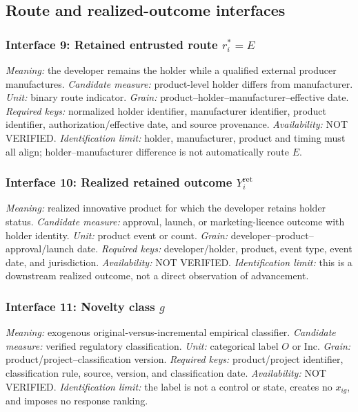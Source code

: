 \subsection{Route and realized-outcome interfaces}
\label{subsec:p10-routes-outcomes}

\subsubsection{Interface 9: Retained entrusted route \texorpdfstring{\(r_i^*=E\)}{retained route E}}
\textit{Meaning:} the developer remains the holder while a qualified external
producer manufactures.
\textit{Candidate measure:} product-level holder differs from manufacturer.
\textit{Unit:} binary route indicator.
\textit{Grain:} product--holder--manufacturer--effective date.
\textit{Required keys:} normalized holder identifier, manufacturer identifier,
product identifier, authorization/effective date, and source provenance.
\textit{Availability:} NOT VERIFIED.
\textit{Identification limit:} holder, manufacturer, product and timing must
all align; holder--manufacturer difference is not automatically route \(E\).

\subsubsection{Interface 10: Realized retained outcome \texorpdfstring{\(Y_i^{\mathrm{ret}}\)}{retained outcome}}
\textit{Meaning:} realized innovative product for which the developer retains
holder status.
\textit{Candidate measure:} approval, launch, or marketing-licence outcome
with holder identity.
\textit{Unit:} product event or count.
\textit{Grain:} developer--product--approval/launch date.
\textit{Required keys:} developer/holder, product, event type, event date, and
jurisdiction.
\textit{Availability:} NOT VERIFIED.
\textit{Identification limit:} this is a downstream realized outcome, not a
direct observation of advancement.

\subsubsection{Interface 11: Novelty class \texorpdfstring{\(g\)}{novelty class}}
\textit{Meaning:} exogenous original-versus-incremental empirical classifier.
\textit{Candidate measure:} verified regulatory classification.
\textit{Unit:} categorical label \(O\) or \(\mathrm{Inc}\).
\textit{Grain:} product/project--classification version.
\textit{Required keys:} product/project identifier, classification rule,
source, version, and classification date.
\textit{Availability:} NOT VERIFIED.
\textit{Identification limit:} the label is not a control or state, creates no
\(x_{ig}\), and imposes no response ranking.

